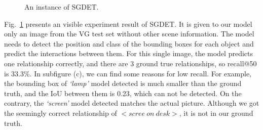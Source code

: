 \begin{figure}[H]
 	\caption[An instance of SGDET.]{An instance of SGDET.}
 	\label{fig:sgdet}
 \end{figure}
Fig.~\ref{fig:sgdet} presents an visible experiment result of SGDET. It is given to our model only an image from the VG test set without other scene information. The model needs to detect the position and class of the bounding boxes for each object and predict the interactions between them. For this single image, the model predicts one relationship correctly, and there are 3 ground true relationships, so recall@50 is 33.3\%.  In subfigure (c), we can find some reasons for low recall. For example, the bounding box of \textit{`lamp' } model detected is much smaller than the ground truth, and the IoU between them is 0.23, which can not be detected. On the contrary, the \textit{`screen' } model detected matches the actual picture. Although we got the seemingly correct relationship of $ <scree\ on \ desk> $, it is not in our ground truth.







